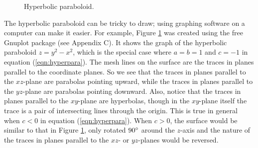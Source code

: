 \begin{figure}[h]
 \begin{center}
  
 \end{center}
 \caption[]{\quad Hyperbolic paraboloid.}
 \label{fig:hyperpara}
\end{figure}

The hyperbolic paraboloid can be tricky to draw; using graphing software on a computer can make it
easier.
For example, Figure \ref{fig:hyperpara} was created using the free Gnuplot package (see Appendix C). It shows the graph
of the hyperbolic paraboloid
$z = y^2 - x^2$, which is the special case where $a = b = 1$ and $c = -1$ in equation (\ref{eqn:hyperpara}).
The mesh lines on the surface are the traces in planes parallel to the coordinate planes.
So we see that the traces in planes parallel to the $xz$-plane are parabolas pointing upward,
while the traces in planes parallel to the $yz$-plane are parabolas pointing downward. Also, notice that the traces in
planes parallel to the $xy$-plane are hyperbolas, though in the $xy$-plane itself the trace is a pair of intersecting
lines through the origin. 
This is true in general when $c < 0$ in equation (\ref{eqn:hyperpara}).
When $c > 0$, the surface would be similar to that
in Figure \ref{fig:hyperpara}, only rotated $90^\circ$ around the $z$-axis and the nature
of the traces in planes parallel to the $xz$- or $yz$-planes would be reversed.

